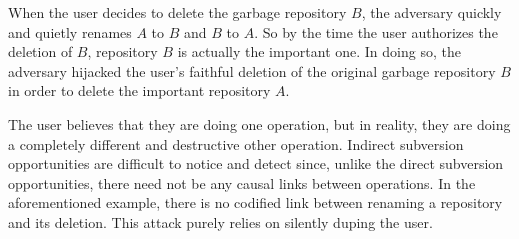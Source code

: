 When the user decides to delete the garbage repository $B$, the adversary quickly and quietly renames $A$ to $B$ and $B$ to $A$. So by the time the user authorizes the deletion of $B$, repository $B$ is actually the important one. In doing so, the adversary hijacked the user's faithful deletion of the original garbage repository $B$ in order to delete the important repository $A$. 

\iffalse
While the user is in the process of deleting a repository $B$, 
\fi

The user believes that they are doing one operation, but in reality, they are doing a completely different and destructive other operation. Indirect subversion opportunities are difficult to notice and detect since, unlike the direct subversion opportunities, there need not be any causal links between operations. In the aforementioned example, there is no codified link between renaming a repository and its deletion. This attack purely relies on silently duping the user.

